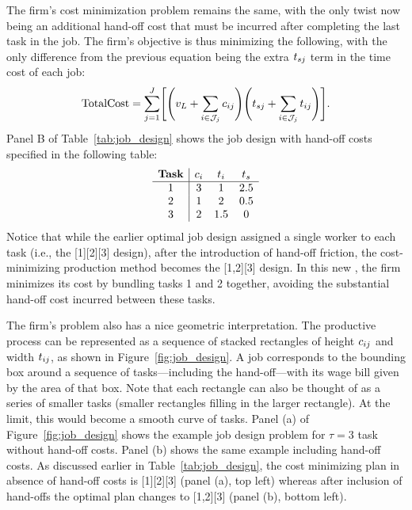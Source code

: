 \documentclass{article}
\theoremstyle{plain}
\theoremstyle{plain}
\begin{document}
The firm's cost minimization problem remains the same, with the only twist now being an additional hand-off cost that must be incurred after completing the last task in the job. 
The firm's objective is thus minimizing the following, with the only difference from the previous equation being the extra $t_{sj}$ term in the time cost of each job:
\[
\text{TotalCost} = \sum_{j=1}^J \Biggl[\Biggl(v_L + \sum_{i \in \mathcal{J}_j} c_{ij} \Biggr) \Biggl(t_{sj} + \sum_{i \in \mathcal{J}_j} t_{ij} \Biggr)\Biggr].
\]
Panel B of Table~\ref{tab:job_design} shows the job design with hand-off costs specified in the following table:
\[
\begin{array}{c|ccc}
\textbf{Task} & c_{i} & t_{i} & t_{s} \\ \hline
1 & 3  & 1   & 2.5 \\
2 & 1 & 2   & 0.5 \\
3 & 2   & 1.5 & 0 \\
\end{array}
\]
Notice that while the earlier optimal job design assigned a single worker to each task (i.e., the [1][2][3] design), after the introduction of hand-off friction, the cost-minimizing production method becomes the [1,2][3] design.  
In this new , the firm minimizes its cost by bundling tasks 1 and 2 together, avoiding the substantial hand-off cost incurred between these tasks.

The firm's problem also has a nice geometric interpretation.
The productive process can be represented as a sequence of stacked rectangles of height $c_{ij}$ and width $t_{ij}$, as shown in Figure~\ref{fig:job_design}.
A job corresponds to the bounding box around a sequence of tasks---including the hand-off---with its wage bill given by the area of that box.
Note that each rectangle can also be thought of as a series of smaller tasks (smaller rectangles filling in the larger rectangle).
At the limit, this would become a smooth curve of tasks.
Panel (a) of Figure~\ref{fig:job_design} shows the example job design problem for $\tau=3$ task without hand-off costs.
Panel (b) shows the same example including hand-off costs.
As discussed earlier in Table~\ref{tab:job_design}, the cost minimizing plan in absence of hand-off costs is [1][2][3] (panel (a), top left) whereas after inclusion of hand-offs the optimal plan changes to [1,2][3] (panel (b), bottom left).
\end{document}
